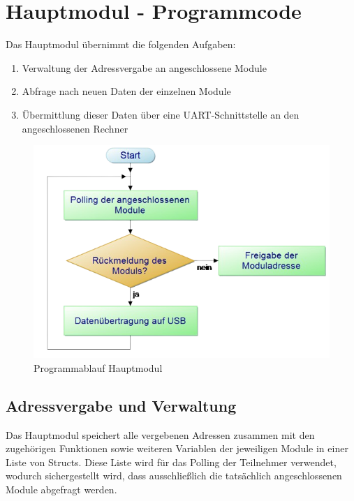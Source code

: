 

\section{Hauptmodul - Programmcode}
Das Hauptmodul übernimmt die folgenden Aufgaben:
\begin{enumerate}
    \item Verwaltung der Adressvergabe an angeschlossene Module
    \item Abfrage nach neuen Daten der einzelnen Module
    \item Übermittlung dieser Daten über eine UART-Schnittstelle an den angeschlossenen Rechner
\end{enumerate}

\begin{figure}[H]
	\centering    
	\includegraphics[width=.75\textwidth]{Bilder/pap_hauptmodul.png}
	\caption{Programmablauf Hauptmodul}
	\label{Programm_Hauptmodul}
\end{figure}
\textmd{
}

\subsection{Adressvergabe und Verwaltung}
Das Hauptmodul speichert alle vergebenen Adressen zusammen mit den zugehörigen Funktionen sowie weiteren Variablen der jeweiligen Module in einer Liste von Structs. Diese Liste wird für das Polling der Teilnehmer verwendet, wodurch sichergestellt wird, dass ausschließlich die tatsächlich angeschlossenen Module abgefragt werden.\\





